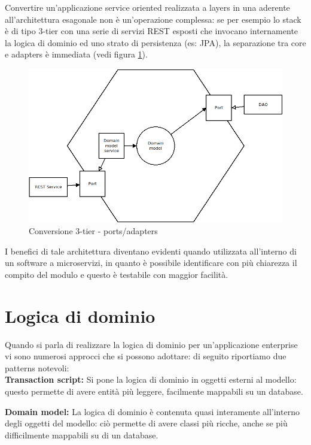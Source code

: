 Convertire un'applicazione service oriented realizzata a layers in una aderente all'architettura esagonale non è un'operazione complessa: se per esempio lo stack è di tipo 3-tier con una serie di servizi REST esposti che invocano internamente la logica di dominio ed uno strato di persistenza (es: JPA), la separazione tra core e adapters è immediata (vedi figura \ref{fig:hexagonal_3_tier}).

\begin{figure}[h]
	\centering
	\includegraphics[scale=0.5]{img/hexagonal_3_tier}
	\caption{Conversione 3-tier - ports/adapters}
	\label{fig:hexagonal_3_tier}
\end{figure}

I benefici di tale architettura diventano evidenti quando utilizzata all'interno di un software a microservizi, in quanto è possibile identificare con più chiarezza il compito del modulo e questo è testabile con maggior facilità.


\section{Logica di dominio}

Quando si parla di realizzare la logica di dominio per un'applicazione enterprise vi sono numerosi approcci che si possono adottare: di seguito riportiamo due patterns notevoli\cite{enterprise_app}:\\
\textbf{Transaction script:} Si pone la logica di dominio in oggetti esterni al modello: questo permette di avere entità più leggere, facilmente mappabili su un database.

\textbf{Domain model:} La logica di dominio è contenuta quasi interamente all'interno degli oggetti del modello: ciò permette di avere classi più ricche, anche se più difficilmente mappabili su di un database.

